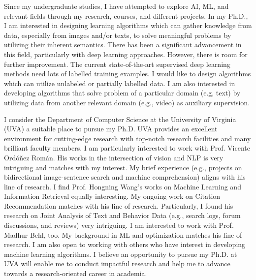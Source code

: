\documentclass[12pt]{article}
\begin{document}
Since my undergraduate studies, I have attempted to explore AI, ML, and relevant fields through my research, courses, and different projects. In my Ph.D., I am interested in designing learning algorithms which can gather knowledge from data, especially from images and/or texts, to solve meaningful problems by utilizing their inherent semantics. There has been a significant advancement in this field, particularly with deep learning approaches. However, there is room for further improvement. The current state-of-the-art supervised deep learning methods need lots of labelled training examples. I would like to design algorithms which can utilize unlabeled or partially labelled data. I am also interested in developing algorithms that solve problem of a particular domain (e.g, text) by utilizing data from another relevant domain (e.g., video) as auxiliary supervision.

I consider the Department of Computer Science at the University of Virginia (UVA) a suitable place to pursue my Ph.D. UVA provides an excellent environment for cutting-edge research with top-notch research facilities and many brilliant faculty members. I am particularly interested to work with Prof. Vicente Ord\'o\~nez Rom\'an. His works in the intersection of vision and NLP is very intriguing and matches with my interest. My brief experience (e.g., projects on bidirectional image-sentence search and machine comprehension) aligns with his line of research. I find Prof. Hongning Wang's works on Machine Learning and Information Retrieval equally interesting. My ongoing work on Citation Recommendation matches with his line of research. Particularly, I found his research on Joint Analysis of Text and Behavior Data (e.g., search logs, forum discussions, and reviews) very intriguing. I am interested to work with Prof. Madhur Behl, too. My background in ML and optimization matches his line of research. I am also open to working with others who have interest in developing machine learning algorithms. I believe an opportunity to pursue my Ph.D. at UVA will enable me to conduct impactful research and help me to advance towards a research-oriented career in academia.


\end{document}
